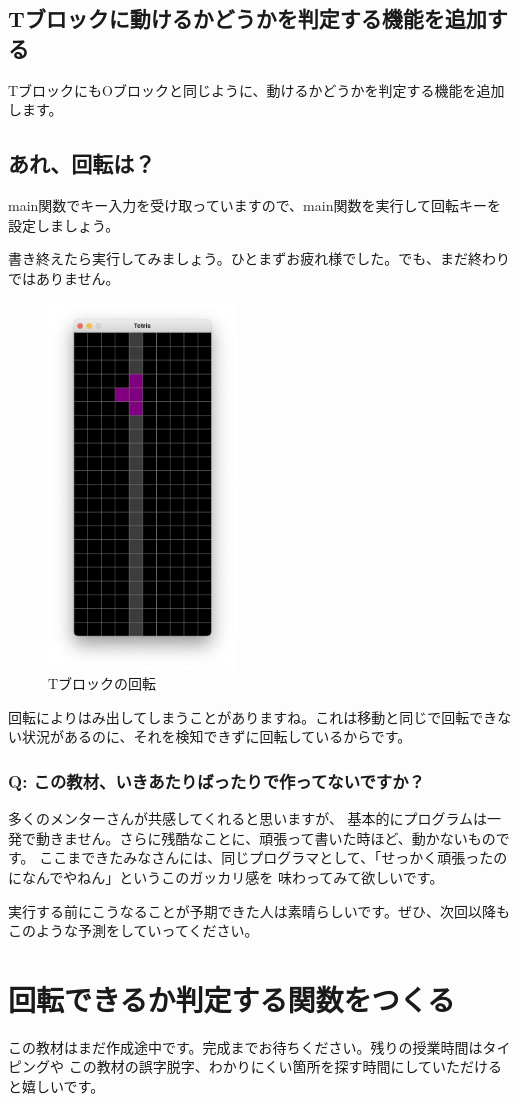 \documentclass[12pt, a4paper, dvipdfmx]{book}
\begin{document}
\subsection{Tブロックに動けるかどうかを判定する機能を追加する}
TブロックにもOブロックと同じように、動けるかどうかを判定する機能を追加します。


\subsection{あれ、回転は？}
main関数でキー入力を受け取っていますので、main関数を実行して回転キーを設定しましょう。


書き終えたら実行してみましょう。ひとまずお疲れ様でした。でも、まだ終わりではありません。
\begin{figure}[h]
  \centering
  \includegraphics[width=50mm]{CH7_4.png}
  \caption{Tブロックの回転}
\end{figure}

回転によりはみ出してしまうことがありますね。これは移動と同じで回転できない状況があるのに、それを検知できずに回転しているからです。

\subsubsection{Q: この教材、いきあたりばったりで作ってないですか？}
多くのメンターさんが共感してくれると思いますが、
基本的にプログラムは一発で動きません。さらに残酷なことに、頑張って書いた時ほど、動かないものです。
ここまできたみなさんには、同じプログラマとして、「せっかく頑張ったのになんでやねん」というこのガッカリ感を
味わってみて欲しいです。

実行する前にこうなることが予期できた人は素晴らしいです。ぜひ、次回以降もこのような予測をしていってください。

\section{回転できるか判定する関数をつくる}
この教材はまだ作成途中です。完成までお待ちください。残りの授業時間はタイピングや
この教材の誤字脱字、わかりにくい箇所を探す時間にしていただけると嬉しいです。
\end{document}

